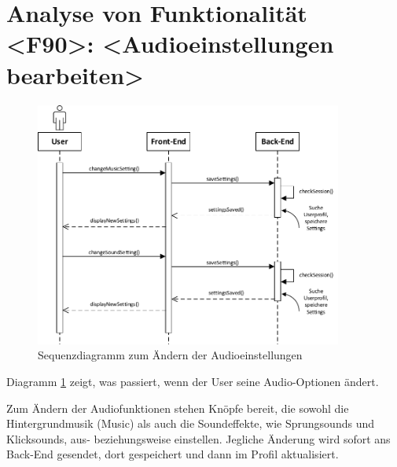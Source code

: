 \section{Analyse von Funktionalität <F90>: <Audioeinstellungen bearbeiten>}
\begin{figure}[h]
\centering
\includegraphics[width=0.9\textwidth]{figures/sequenz_F90.pdf}
\caption{Sequenzdiagramm zum Ändern der Audioeinstellungen}
\label{sequence_f90}
\end{figure}
Diagramm \ref{sequence_f90} zeigt, was passiert, wenn der User seine Audio-Optionen ändert.

Zum Ändern der Audiofunktionen stehen Knöpfe bereit, die sowohl die Hintergrundmusik (\glqq Music\grqq) als auch die Soundeffekte, wie Sprungsounds und Klicksounds,  aus-  beziehungsweise einstellen. Jegliche \"Anderung wird sofort ans Back-End gesendet, dort gespeichert und dann im Profil aktualisiert.

\newpage
